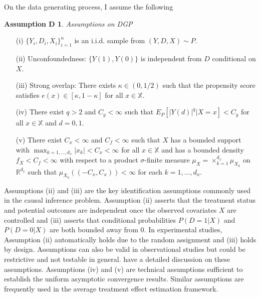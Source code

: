 \documentclass[12pt,oneside,reqno,english]{amsart}
\theoremstyle{definition}
\newtheorem*{asmD}{Assumption D}
\begin{document}
On the data generating process, I assume the following 
\begin{asmD} \textit{Assumptions on DGP} 
\begin{itemize}
     \item[{(i)}] $\{Y_{i},D_{i},X_{i}\}_{i=1}^{n}$ is an i.i.d. sample from $(Y, D, X)\sim P$.
     \item[{(ii)}] Unconfoundedness: $\{Y(1),Y(0)\}$ is independent from $D$ conditional on $X$.   
     \item[{(iii)}] Strong overlap: There exists $\kappa\in (0,1/2)$ such that the propensity score satisfies $e(x)\in [\kappa,1-\kappa]$ for all $x\in \mathbb{X}$.
     \item[{(iv)}] There exist $q>2$ and $C_{y}<\infty$ such that $E_{P}[|Y(d)|^{q}|X=x]<C_{y}$ for all $x\in \mathbb{X}$ and $d = 0,1$.
     \item[{(v)}] There exist $C_{x}<\infty$ and $C_{f}<\infty$ such that $X$ has a bounded support with $\max_{k=1,\ldots,d_{x}} |x_{k}| < C_{x}<\infty$ for all $x\in \mathbb{X}$ and has a bounded density $f_{X}< C_{f}<\infty$ 
     with respect to a product $\sigma$-finite measure $\mu_{X}=\times_{k=1}^{d_{x}}\mu_{X_{k}}$ on $\mathbb{R}^{d_{x}}$
     such that $\mu_{X_{k}}\left(\left(-C_{x},C_{x}\right)\right)<\infty$ for each $k=1,\ldots,d_{x}$. 
\end{itemize}
\end{asmD}
Assumptions (ii) and (iii) are the key identification assumptions commonly used in the causal inference problem. 
Assumption (ii) asserts that the treatment status and potential outcomes are independent once the observed covariates $X$ are controlled and   
(iii) asserts that conditional probabilities $P(D=1|X)$ and $P(D=0|X)$ are both bounded away from $0$.
In experimental studies, Assumption (ii) automatically holds due to the random assignment 
and (iii) holds by design. Assumptions can also be valid in observational studies but could be restrictive and not testable in general.
 \cite{IR:15} have a detailed discussion on these assumptions. 
Assumptions (iv) and (v) are technical assumptions sufficient to establish the uniform asymptotic convergence results. 
Similar assumptions are frequently used in the average treatment effect estimation framework. 
\end{document}
